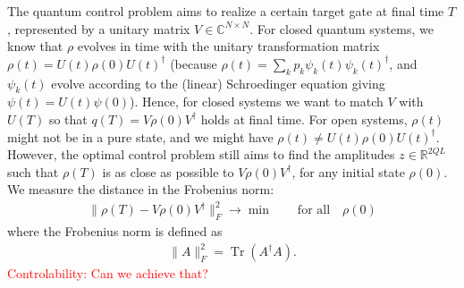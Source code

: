 \documentclass[letterpaper]{article}
\DeclareMathOperator{\Tr}{Tr}
\newcommand{\R}{\mathds{R}}
\newcommand{\C}{\mathds{C}}
\begin{document}
The quantum control problem aims to realize a certain target gate at final time $T$, represented by a unitary matrix $V\in \C^{N\times N}$. For closed quantum systems, we know that $\rho$ evolves in time with the unitary transformation matrix $\rho(t) = U(t)\rho(0) U(t)^{\dagger}$ (because $\rho(t) = \sum_k p_k \psi_k(t)\psi_k(t)^{\dagger}$, and $\psi_k(t)$ evolve according to the (linear) Schroedinger equation giving $\psi(t) = U(t) \psi(0)$). Hence, for closed systems we want to match $V$ with $U(T)$ so that $q(T) = V\rho(0)V^{\dagger}$ holds at final time. For open systems, $\rho(t)$ might not be in a pure state, and we might have $\rho(t) \neq U(t)\rho(0) U(t)^{\dagger}$. However, the optimal control problem still aims to find the amplitudes $z\in \R^{2QL}$ such that $\rho(T)$ is as close as possible to $V\rho(0)V^{\dagger}$, for any initial state $\rho(0)$. We measure the distance in the Frobenius norm:
\begin{align}\label{optimproblem_matrix}
 \| \rho(T) - V\rho(0)V^{\dagger} \|^2_F \rightarrow \min  \qquad \text{for all} \quad \rho(0)
\end{align} 
where the Frobenius norm is defined as 
\begin{align}
  \|A\|^2_F = \Tr(A^{\dagger}A).
\end{align}
\textcolor{red}{Controlability: Can we achieve that?}
\end{document}
